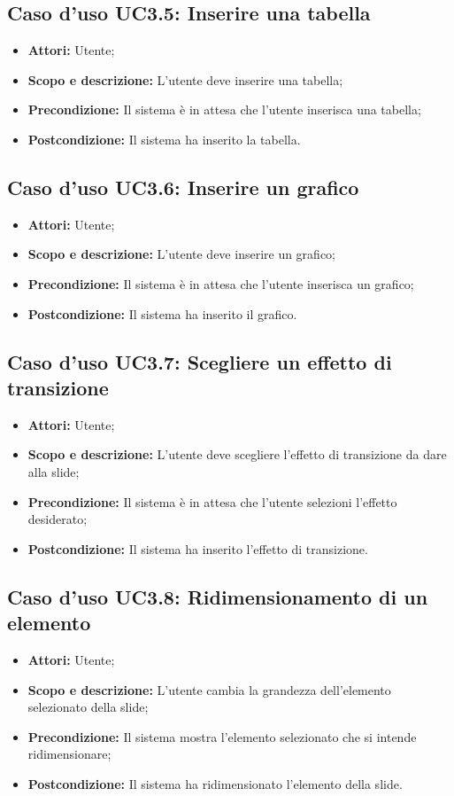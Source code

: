 \subsection{Caso d'uso UC3.5: Inserire una tabella}
\begin{itemize}
	\item \textbf{Attori:} Utente;
	\item \textbf{Scopo e descrizione:} L'utente deve inserire una tabella;
	\item \textbf{Precondizione:} Il sistema è in attesa che l'utente inserisca una tabella;
	\item \textbf{Postcondizione:} Il sistema ha inserito la tabella.
\end{itemize}


\subsection{Caso d'uso UC3.6: Inserire un grafico}
\begin{itemize}
	\item \textbf{Attori:} Utente;
	\item \textbf{Scopo e descrizione:} L'utente deve inserire un grafico;
	\item \textbf{Precondizione:} Il sistema è in attesa che l'utente inserisca un grafico;
	\item \textbf{Postcondizione:} Il sistema ha inserito il grafico.
\end{itemize}

\subsection{Caso d'uso UC3.7: Scegliere un effetto di transizione}
\begin{itemize}
	\item \textbf{Attori:} Utente;
	\item \textbf{Scopo e descrizione:} L'utente deve scegliere l'effetto di transizione da dare alla slide;
	\item \textbf{Precondizione:} Il sistema è in attesa che l'utente selezioni l'effetto desiderato;
	\item \textbf{Postcondizione:} Il sistema ha inserito l'effetto di transizione.
\end{itemize}

\subsection{Caso d'uso UC3.8: Ridimensionamento di un elemento}
\begin{itemize}
	\item \textbf{Attori:} Utente;
	\item \textbf{Scopo e descrizione:} L'utente cambia la grandezza dell'elemento selezionato della slide;
	\item \textbf{Precondizione:} Il sistema mostra l'elemento selezionato che si intende ridimensionare;
	\item \textbf{Postcondizione:} Il sistema ha ridimensionato l'elemento della slide.
\end{itemize}

